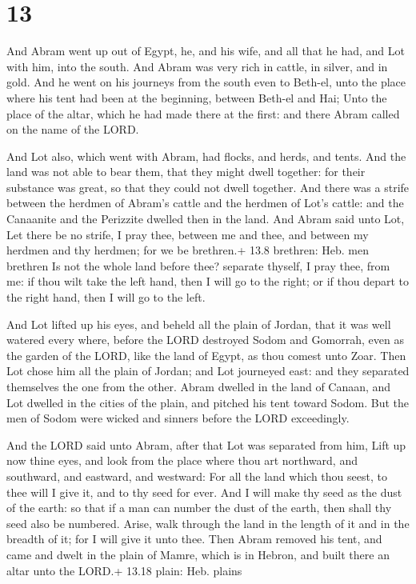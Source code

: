 \hypertarget{section-12}{%
\section{13}\label{section-12}}

 And Abram went up out of Egypt, he, and his wife, and all
that he had, and Lot with him, into the south.  And Abram
was very rich in cattle, in silver, and in gold.  And he
went on his journeys from the south even to Beth-el, unto the place
where his tent had been at the beginning, between Beth-el and Hai;
 Unto the place of the altar, which he had made there at the
first: and there Abram called on the name of the LORD.

 And Lot also, which went with Abram, had flocks, and
herds, and tents.  And the land was not able to bear them,
that they might dwell together: for their substance was great, so that
they could not dwell together.  And there was a strife
between the herdmen of Abram's cattle and the herdmen of Lot's cattle:
and the Canaanite and the Perizzite dwelled then in the land.
 And Abram said unto Lot, Let there be no strife, I pray
thee, between me and thee, and between my herdmen and thy herdmen; for
we be brethren.+ 13.8 brethren: Heb. men brethren  Is not
the whole land before thee? separate thyself, I pray thee, from me: if
thou wilt take the left hand, then I will go to the right; or if thou
depart to the right hand, then I will go to the left.

 And Lot lifted up his eyes, and beheld all the plain of
Jordan, that it was well watered every where, before the LORD destroyed
Sodom and Gomorrah, even as the garden of the LORD, like the land of
Egypt, as thou comest unto Zoar.  Then Lot chose him all
the plain of Jordan; and Lot journeyed east: and they separated
themselves the one from the other.  Abram dwelled in the
land of Canaan, and Lot dwelled in the cities of the plain, and pitched
his tent toward Sodom.  But the men of Sodom were wicked
and sinners before the LORD exceedingly.

 And the LORD said unto Abram, after that Lot was
separated from him, Lift up now thine eyes, and look from the place
where thou art northward, and southward, and eastward, and westward:
 For all the land which thou seest, to thee will I give it,
and to thy seed for ever.  And I will make thy seed as the
dust of the earth: so that if a man can number the dust of the earth,
then shall thy seed also be numbered.  Arise, walk through
the land in the length of it and in the breadth of it; for I will give
it unto thee.  Then Abram removed his tent, and came and
dwelt in the plain of Mamre, which is in Hebron, and built there an
altar unto the LORD.+ 13.18 plain: Heb. plains

